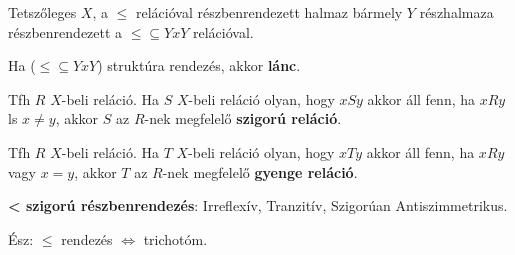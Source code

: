 \begin{frame}
\begin{tcolorbox}[title={Def.: Szigorú, gyenge reláció, Lánc}]
Tetszőleges $X$, a $\leq$ relációval részbenrendezett halmaz bármely $Y$ részhalmaza részbenrendezett a $\leq \subseteq Y x Y$ relációval.\\
\msmallskip

Ha ($\leq \subseteq Y x Y$) struktúra rendezés, akkor \textbf{lánc}.\\
\mmedskip

Tfh $R$ $X$-beli reláció. Ha $S$ $X$-beli reláció olyan, hogy $xSy$ akkor áll fenn, ha $xRy$ ls $x \neq y$, akkor $S$ az $R$-nek megfelelő \textbf{szigorú reláció}.\\
\mmedskip

Tfh $R$ $X$-beli reláció. Ha $T$ $X$-beli reláció olyan, hogy $xTy$ akkor áll fenn, ha $xRy$ vagy $x = y$, akkor $T$ az $R$-nek megfelelő \textbf{gyenge reláció}.\\
\mmedskip

\textbf{< szigorú részbenrendezés}: Irreflexív, Tranzitív, Szigorúan Antiszimmetrikus.\\
\mmedskip

Ész: $\leq$ rendezés $\iff$ trichotóm.
\end{tcolorbox}
\end{frame}


